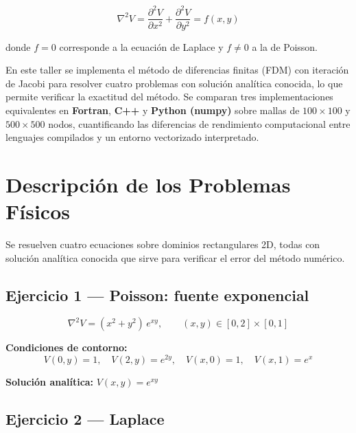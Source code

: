 \documentclass[12pt, a4paper]{article}
\begin{document}
\begin{equation}
  \nabla^2 V = \frac{\partial^2 V}{\partial x^2} + \frac{\partial^2 V}{\partial y^2} = f(x,y)
  \label{eq:poisson_general}
\end{equation}

donde $f=0$ corresponde a la ecuación de Laplace y $f\neq 0$ a la de Poisson.

En este taller se implementa el método de diferencias finitas (FDM) con
iteración de Jacobi para resolver cuatro problemas con solución analítica
conocida, lo que permite verificar la exactitud del método. Se comparan tres
implementaciones equivalentes en \textbf{Fortran}, \textbf{C++} y
\textbf{Python (numpy)} sobre mallas de $100\times100$ y $500\times500$ nodos,
cuantificando las diferencias de rendimiento computacional entre lenguajes
compilados y un entorno vectorizado interpretado.

\section{Descripción de los Problemas Físicos}

Se resuelven cuatro ecuaciones sobre dominios rectangulares 2D, todas con
solución analítica conocida que sirve para verificar el error del método
numérico.

\subsection{Ejercicio 1 — Poisson: fuente exponencial}

\begin{equation}
  \nabla^2 V = (x^2 + y^2)\,e^{xy}, \qquad (x,y)\in[0,2]\times[0,1]
  \label{eq:ej1}
\end{equation}

\textbf{Condiciones de contorno:}
\[
  V(0,y)=1,\quad V(2,y)=e^{2y},\quad V(x,0)=1,\quad V(x,1)=e^x
\]

\textbf{Solución analítica:} $V(x,y) = e^{xy}$

\subsection{Ejercicio 2 — Laplace}
\end{document}
